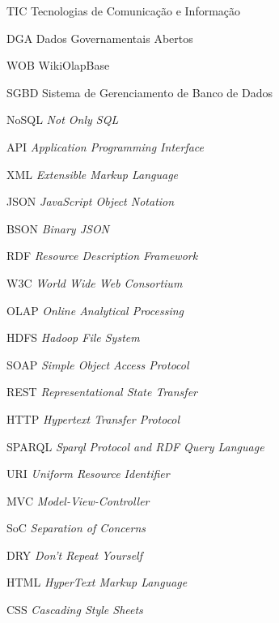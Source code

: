 
\begin{siglas}
    \item[TIC] Tecnologias de Comunicação e Informação 
    \item[DGA] Dados Governamentais Abertos
    \item[WOB] WikiOlapBase
    \item[SGBD] Sistema de Gerenciamento de Banco de Dados
    \item[NoSQL] \textit{Not Only SQL}
    \item[API] \textit{Application Programming Interface}
    \item[XML] \textit{Extensible Markup Language}
    \item[JSON] \textit{JavaScript Object Notation}
    \item[BSON] \textit{Binary JSON}
    \item[RDF] \textit{Resource Description Framework}
    \item[W3C] \textit{World Wide Web Consortium}
    \item[OLAP] \textit{Online Analytical Processing}
    \item[HDFS] \textit{Hadoop File System}
    \item[SOAP] \textit{Simple Object Access Protocol}
    \item[REST] \textit{Representational State Transfer}
    \item[HTTP] \textit{Hypertext Transfer Protocol}
    \item[SPARQL] \textit{Sparql Protocol and RDF Query Language}
    \item[URI] \textit{Uniform Resource Identifier}
    \item[MVC] \textit{Model-View-Controller}
    \item[SoC] \textit{Separation of Concerns}
    \item[DRY] \textit{Don't Repeat Yourself}
    \item[HTML] \textit{HyperText Markup Language}
    \item[CSS] \textit{Cascading Style Sheets}
\end{siglas}

